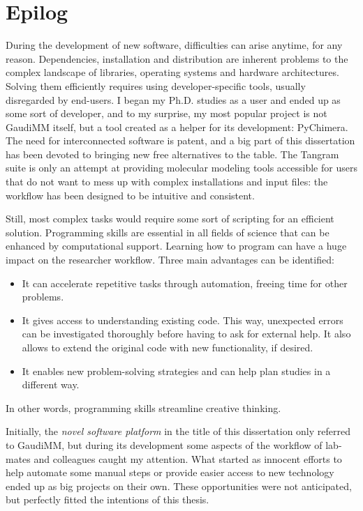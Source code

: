 \chapter*{Epilog}
\label{chap:epilog}

During the development of new software, difficulties can arise anytime, for any reason. Dependencies, installation and distribution are inherent problems to the complex landscape of libraries, operating systems and hardware architectures. Solving them efficiently requires using developer-specific tools, usually disregarded by end-users. I began my Ph.D. studies as a user and ended up as some sort of developer, and to my surprise, my most popular project is not GaudiMM itself, but a tool created as a helper for its development: PyChimera. The need for interconnected software is patent, and a big part of this dissertation has been devoted to bringing new free alternatives to the table. The Tangram suite is only an attempt at providing molecular modeling tools accessible for users that do not want to mess up with complex installations and input files: the workflow has been designed to be intuitive and consistent.

Still, most complex tasks would require some sort of scripting for an efficient solution. Programming skills are essential in all fields of science that can be enhanced by computational support. Learning how to program can have a huge impact on the researcher workflow. Three main advantages can be identified:

\begin{itemize}
    \item It can accelerate repetitive tasks through automation, freeing time for other problems.
    \item It gives access to understanding existing code. This way, unexpected errors can be investigated thoroughly before having to ask for external help. It also allows to extend the original code with new functionality, if desired.
    \item It enables new problem-solving strategies and can help plan studies in a different way.
\end{itemize}

In other words, programming skills streamline creative thinking.

Initially, the \textit{novel software platform} in the title of this dissertation only referred to GaudiMM, but during its development some aspects of the workflow of lab-mates and colleagues caught my attention. What started as innocent efforts to help automate some manual steps or provide easier access to new technology ended up as big projects on their own. These opportunities were not anticipated, but perfectly fitted the intentions of this thesis.

